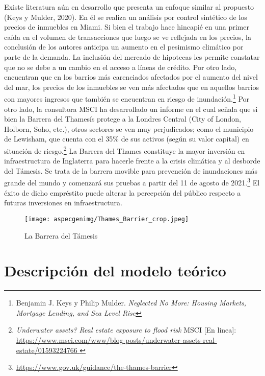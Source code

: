 \documentclass[12pt]{article}
\begin{document}
 Existe literatura aún en desarrollo que presenta un enfoque similar al propuesto (Keys y Mulder, 2020). En él se realiza un análisis por control sintético de los precios de inmuebles en Miami. Si bien el trabajo hace hincapié en una primer caída en el volumen de transacciones que luego se ve reflejada en los precios, la conclusión de los autores anticipa un aumento en el pesimismo climático por parte de la demanda. La inclusión del mercado de hipotecas les permite constatar que no se debe a un cambio en el acceso a líneas de crédito. Por otro lado, encuentran que en los barrios más carenciados afectados por el aumento del nivel del mar, los precios de los inmuebles se ven más afectados que en aquellos barrios con mayores ingresos que también se encuentran en riesgo de inundación.\footnote{Benjamin J. Keys y Philip Mulder. \textit{Neglected No More: Housing Markets, Mortgage Lending, and Sea Level Rise}}	
Por otro lado, la consultora MSCI ha desarrollado un informe en el cual señala que si bien la Barrera del Thamesís protege a la Londres Central (City of London, Holborn, Soho, etc.), otros sectores se ven muy perjudicados; como el municipio de Lewisham, que cuenta con el 35\% de sus activos (según su valor capital) en situación de riesgo.\footnote{\textit{Underwater assets? Real estate exposure to flood risk} MSCI [En linea]: \url{https://www.msci.com/www/blog-posts/underwater-assets-real-estate/01593224766 }} La Barrera del Thames constituye la mayor inversión en infraestructura de Inglaterra para hacerle frente a la crisis climática y al desborde del Támesis. Se trata de la barrera movible para prevención de inundaciones más grande del mundo y  comenzará sus pruebas a partir del 11 de agosto de 2021.\footnote{\url{https://www.gov.uk/guidance/the-thames-barrier}} El éxito de dicho empréstito puede alterar la percepción del público respecto a futuras inversiones en infraestructura.

\begin{figure}[H]
\centering
\texttt{[image: aspecgenimg/Thames\_Barrier\_crop.jpeg]}
\caption*{La Barrera del Támesis}
\end{figure}
\pagebreak

\section{Descripción del modelo teórico}
\label{sec:Descripcion}
\end{document}
